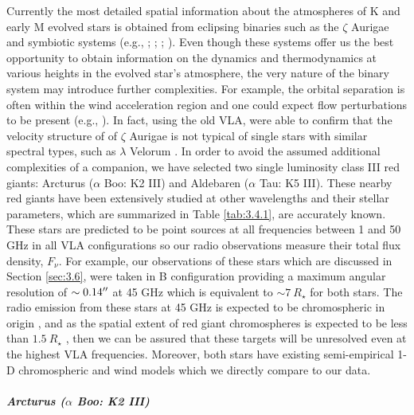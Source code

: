 Currently the most detailed spatial information about the atmospheres of K and early M evolved stars is obtained from eclipsing binaries such as the $\zeta$ Aurigae and symbiotic systems (e.g., \citealt{wright_1970}; \citealt{baade_1996}; \citealt{eaton_2008}; \citealt{crowley_2008}). Even though these systems offer us the best opportunity to obtain information on the dynamics and thermodynamics at various heights in the evolved star's atmosphere, the very nature of the binary system may introduce further complexities. For example, the orbital separation is often within the wind acceleration region and one could expect flow perturbations to be present (e.g., \citealt{chapman_1981}). In fact, using the old VLA, \cite{harper_2005} were able to confirm that the velocity structure of  of $\zeta$ Aurigae is not typical of single stars with similar spectral types, such as $\lambda$ Velorum \citep{carpenter_1999}. In order to avoid the assumed additional complexities of a companion, we have selected two single luminosity class III red giants: Arcturus ($\alpha$ Boo: K2 III) and Aldebaren ($\alpha$ Tau: K5 III). These nearby red giants have been extensively studied at other wavelengths and their stellar parameters, which are summarized in Table \ref{tab:3.4.1}, are accurately known. These stars are predicted to be point sources at all frequencies between 1 and 50 GHz in all VLA configurations so our radio observations measure their total flux density, $F_{\nu}$. For example, our observations of these stars which are discussed in Section \ref{sec:3.6}, were taken in B configuration providing a maximum angular resolution of $\sim 0.14 ^{\prime\prime}$ at 45 GHz which is equivalent to $\sim 7\ R_{\star}$ for both stars. The radio emission from these stars at 45 GHz is expected to be chromospheric in origin \citep{harper_2013}, and as the spatial extent of red giant chromospheres is expected to be less than $1.5 \ R_{\star}$ \citep{berio_2011}, then we can be assured that these targets will be unresolved even at the highest VLA frequencies. Moreover, both stars have existing semi-empirical 1-D chromospheric and wind models which we directly compare to our data.
\\
\\
\textbf{\textit{Arcturus ($\alpha$ Boo: K2 III)}}\\
